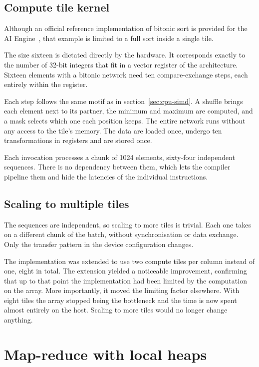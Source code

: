 \subsection{Compute tile kernel}
\label{sec:npu-bitonic-kernel}

Although an official reference implementation of bitonic sort is provided for
the AI Engine~\cite{amd2024bitonicaie}, that example is limited to a full sort
inside a single tile.

The size sixteen is dictated directly by the hardware. It corresponds exactly
to the number of 32-bit integers that fit in a vector register of the
architecture. Sixteen elements with a bitonic network need ten compare-exchange
steps, each entirely within the register.

Each step follows the same motif as in section~\ref{sec:cpu-simd}. A shuffle
brings each element next to its partner, the minimum and maximum are computed,
and a mask selects which one each position keeps. The entire network runs
without any access to the tile's memory. The data are loaded once, undergo ten
transformations in registers and are stored once.

Each invocation processes a chunk of 1024 elements, sixty-four independent
sequences. There is no dependency between them, which lets the compiler
pipeline them and hide the latencies of the individual instructions.

\subsection{Scaling to multiple tiles}
\label{sec:npu-bitonic-tiles}

The sequences are independent, so scaling to more tiles is trivial. Each one
takes on a different chunk of the batch, without synchronisation or data
exchange. Only the transfer pattern in the device configuration changes.

The implementation was extended to use two compute tiles per column instead of
one, eight in total. The extension yielded a noticeable improvement, confirming
that up to that point the implementation had been limited by the computation on
the array. More importantly, it moved the limiting factor elsewhere. With eight
tiles the array stopped being the bottleneck and the time is now spent almost
entirely on the host. Scaling to more tiles would no longer change anything.

\section{Map-reduce with local heaps}
\label{sec:npu-mapreduce}

